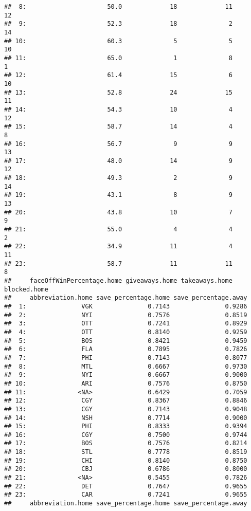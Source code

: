 \documentclass[
]{article}
\begin{document}
\begin{verbatim}
##  8:                      50.0             18             11           12
##  9:                      52.3             18              2           14
## 10:                      60.3              5              5           10
## 11:                      65.0              1              8            1
## 12:                      61.4             15              6           10
## 13:                      52.8             24             15           11
## 14:                      54.3             10              4           12
## 15:                      58.7             14              4            8
## 16:                      56.7              9              9           13
## 17:                      48.0             14              9           12
## 18:                      49.3              2              9           14
## 19:                      43.1              8              9           13
## 20:                      43.8             10              7            9
## 21:                      55.0              4              4            2
## 22:                      34.9             11              4           11
## 23:                      58.7             11             11            8
##     faceOffWinPercentage.home giveaways.home takeaways.home blocked.home
##     abbreviation.home save_percentage.home save_percentage.away
##  1:               VGK               0.7143               0.9286
##  2:               NYI               0.7576               0.8519
##  3:               OTT               0.7241               0.8929
##  4:               OTT               0.8140               0.9259
##  5:               BOS               0.8421               0.9459
##  6:               FLA               0.7895               0.7826
##  7:               PHI               0.7143               0.8077
##  8:               MTL               0.6667               0.9730
##  9:               NYI               0.6667               0.9000
## 10:               ARI               0.7576               0.8750
## 11:              <NA>               0.6429               0.7059
## 12:               CGY               0.8367               0.8846
## 13:               CGY               0.7143               0.9048
## 14:               NSH               0.7714               0.9000
## 15:               PHI               0.8333               0.9394
## 16:               CGY               0.7500               0.9744
## 17:               BOS               0.7576               0.8214
## 18:               STL               0.7778               0.8519
## 19:               CHI               0.8140               0.8750
## 20:               CBJ               0.6786               0.8000
## 21:              <NA>               0.5455               0.7826
## 22:               DET               0.7647               0.9655
## 23:               CAR               0.7241               0.9655
##     abbreviation.home save_percentage.home save_percentage.away
\end{verbatim}
\end{document}
